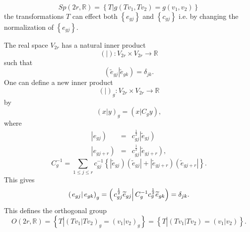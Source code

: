 \documentclass[aps,preprint]{revtex4}
\begin{document}
\begin{equation}
Sp\left( 2r,\mathbb{R}\right) =\left\{ \left. T\right\vert g\left(
Tv_{1},Tv_{2}\right) =g\left( v_{1},v_{2}\right) \right\}
\end{equation}%
the transformations $T$ can effect both $\left\{ e_{gj}\right\} $ and $%
\left\{ c_{gj}\right\} $ i.e. by changing the normalization of $\left\{
e_{gj}\right\} .$

The real space $V_{2r}$ has a natural inner product 
\begin{equation}
\left( \left. {}\right\vert \right) :V_{2r}\times V_{2r}\rightarrow \mathbb{R%
}
\end{equation}%
such that 
\begin{equation}
\left( \left. \widetilde{e}_{gj}\right\vert \widetilde{e}_{gk}\right)
=\delta _{jk}.
\end{equation}%
One can define a new inner product 
\begin{equation}
\left( \left. {}\right\vert \right) _{g}:V_{2r}\times V_{2r}\rightarrow 
\mathbb{R}
\end{equation}%
by 
\begin{equation}
\left( \left. x\right\vert y\right) _{g}=\left( \left. x\right\vert
C_{g}y\right) ,
\end{equation}%
where 
\begin{eqnarray}
\left\vert e_{gj}\right) &=&c_{gj}^{\frac{1}{2}}\left\vert \widetilde{e}%
_{gj}\right) \\
\left\vert e_{gj+r}\right) &=&c_{gj}^{\frac{1}{2}}\left\vert \widetilde{e}%
_{gj+r}\right) ,
\end{eqnarray}%
\begin{equation}
C_{g}^{-1}=\sum\limits_{1\leq j\leq r}c_{gj}^{-1}\left\{ \left\vert 
\widetilde{e}_{gj}\right) \left( \widetilde{e}_{gj}\right\vert +\left\vert 
\widetilde{e}_{gj+r}\right) \left( \widetilde{e}_{gj+r}\right\vert \right\} .
\end{equation}%
This gives 
\begin{equation}
\left( \left. e_{gj}\right\vert e_{gk}\right) _{g}=\left( \left. c_{gj}^{%
\frac{1}{2}}\widetilde{e}_{gj}\right\vert C_{g}^{-1}c_{g}^{\frac{1}{2}}%
\widetilde{e}_{gk}\right) =\delta _{jk}.
\end{equation}%
This defines the orthogonal group 
\begin{equation}
O\left( 2r,\mathbb{R}\right) =\left\{ \left. \overset{}{T}\right\vert \left(
\left. Tv_{1}\right\vert Tv_{2}\right) _{g}=\left( \left. v_{1}\right\vert
v_{2}\right) _{g}\right\} =\left\{ \left. \overset{}{T}\right\vert \left(
\left. Tv_{1}\right\vert Tv_{2}\right) =\left( \left. v_{1}\right\vert
v_{2}\right) \right\} .
\end{equation}%
\end{document}
